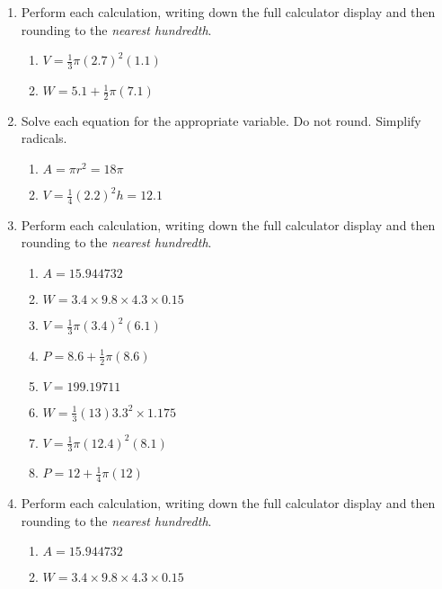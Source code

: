 \begin{enumerate}
\item Perform each calculation, writing down the full calculator display and then rounding to the \emph{nearest hundredth}.
\begin{multicols}{2}
\begin{enumerate}
  \item $V=\frac{1}{3} \pi (2.7)^2(1.1)$
  \item $W=5.1 + \frac{1}{2} \pi (7.1)$  
\end{enumerate}
\end{multicols} %

\item Solve each equation for the appropriate variable. Do not round. Simplify radicals.
\begin{multicols}{2}
\begin{enumerate}%
  \item $A=\pi r^2=18\pi$
  \item $V=\frac{1}{4}(2.2)^2h=12.1$
\end{enumerate}
\end{multicols}%

\item Perform each calculation, writing down the full calculator display and then rounding to the \emph{nearest hundredth}.
  \begin{multicols}{2}
  \begin{enumerate}%
    \item $A=15.944732$
    \item $W=3.4 \times 9.8 \times 4.3 \times 0.15$
          
    \item $V=\frac{1}{3} \pi (3.4)^2(6.1)$
    \item $P=8.6 + \frac{1}{2} \pi (8.6)$  
    \item $V=199.19711$
    \item $W=\frac{1}{3} (13)  3.3^2 \times 1.175$
    \item $V=\frac{1}{3} \pi (12.4)^2(8.1)$
    \item $P=12 + \frac{1}{4} \pi (12)$ 
  \end{enumerate}
  \end{multicols}%

\item Perform each calculation, writing down the full calculator display and then rounding to the \emph{nearest hundredth}.
  \begin{multicols}{2}
  \begin{enumerate}%
    \item $A=15.944732$
    \item $W=3.4 \times 9.8 \times 4.3 \times 0.15$
          

\end{enumerate}
\end{multicols}
\end{enumerate}
